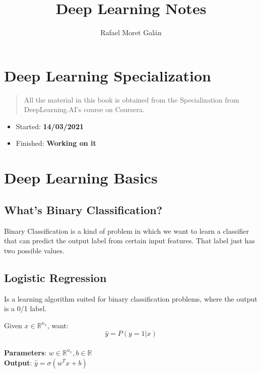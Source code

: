 \documentclass[
]{book}
\title{Deep Learning Notes}
\author{Rafael Moret Galán}
\date{}
\providecommand{\tightlist}{%
  \setlength{\itemsep}{0pt}\setlength{\parskip}{0pt}}
\begin{document}
\maketitle

{
\setcounter{tocdepth}{1}
\tableofcontents
}
\hypertarget{deep-learning-specialization}{%
\chapter{Deep Learning Specialization}\label{deep-learning-specialization}}

\begin{quote}
All the material in this book is obtained from the Specialization from DeepLearning.AI's course on Coursera.
\end{quote}

\begin{itemize}
\tightlist
\item
  Started: \textbf{14/03/2021}
\item
  Finished: \textbf{Working on it}
\end{itemize}

\hypertarget{deep-learning-basics}{%
\chapter{Deep Learning Basics}\label{deep-learning-basics}}

\hypertarget{whats-binary-classification}{%
\section{What's Binary Classification?}\label{whats-binary-classification}}

Binary Classification is a kind of problem in which we want to learn a classifier that can predict the output label from certain input features.
That label just has two possible values.

\hypertarget{logistic-regression}{%
\section{Logistic Regression}\label{logistic-regression}}

Is a learning algorithm suited for binary classification problems, where the output is a 0/1 label.

Given \(x \in \mathbb{R}^{n_x}\), want: \[\hat{y} = P(y = 1 | x)\]\\
\textbf{Parameters}: \(w \in \mathbb{R}^{n_x}, b \in \mathbb{R}\)\\
\textbf{Output}: \(\hat{y} = \sigma (w^Tx + b)\)
\end{document}
